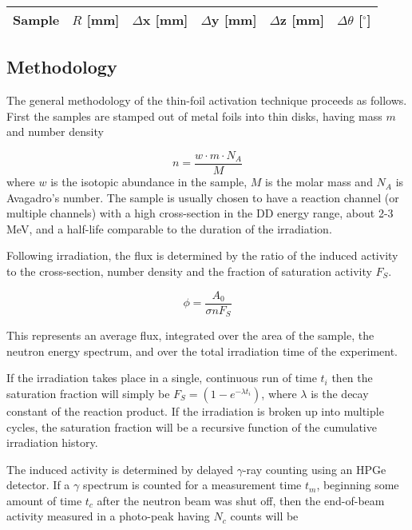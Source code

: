 \documentclass[aps,twocolumn,secnumarabic,balancelastpage,amsmath,amssymb,nofootinbib,floatfix]{revtex4-1}
\begin{document}
\begin{ruledtabular}
\begin{tabular}{cccccc}
Sample & $R$ [mm]& $\Delta$x [mm] & $\Delta$y [mm] & $\Delta$z [mm] & $\Delta \theta$ [$^{\circ}$] \\ 
\hline

\end{tabular}
\end{ruledtabular}

\subsection{Methodology}

The general methodology of the thin-foil activation technique proceeds as follows.  First the samples are stamped out of metal foils into thin disks, having mass $m$ and number density

\begin{equation}
n=\frac{w\cdot m \cdot N_A}{M}
\label{eq:number_density}
\end{equation}
where $w$ is the isotopic abundance in the sample, $M$ is the molar mass and $N_A$ is Avagadro's number.  The sample is usually chosen to have a reaction channel (or multiple channels) with a high cross-section in the DD energy range, about 2-3 MeV, and a half-life comparable to the duration of the irradiation.

Following irradiation, the flux is determined by the ratio of the induced activity to the cross-section, number density and the fraction of saturation activity $F_S$.

\begin{equation}
\phi = \frac{A_0}{\sigma n F_S}
\label{eq:flux_calc}
\end{equation}

This represents an average flux, integrated over the area of the sample, the neutron energy spectrum, and over the total irradiation time of the experiment.

If the irradiation takes place in a single, continuous run of time $t_i$ then the saturation fraction will simply be $F_S = (1-e^{-\lambda t_i})$, where $\lambda$ is the decay constant of the reaction product.  If the irradiation is broken up into multiple cycles, the saturation fraction will be a recursive function of the cumulative irradiation history.

The induced activity is determined by delayed $\gamma$-ray counting using an HPGe detector.  If a $\gamma$ spectrum is counted for a measurement time $t_m$, beginning some amount of time $t_c$ after the neutron beam was shut off, then the end-of-beam activity measured in a photo-peak having $N_c$ counts will be
\end{document}

